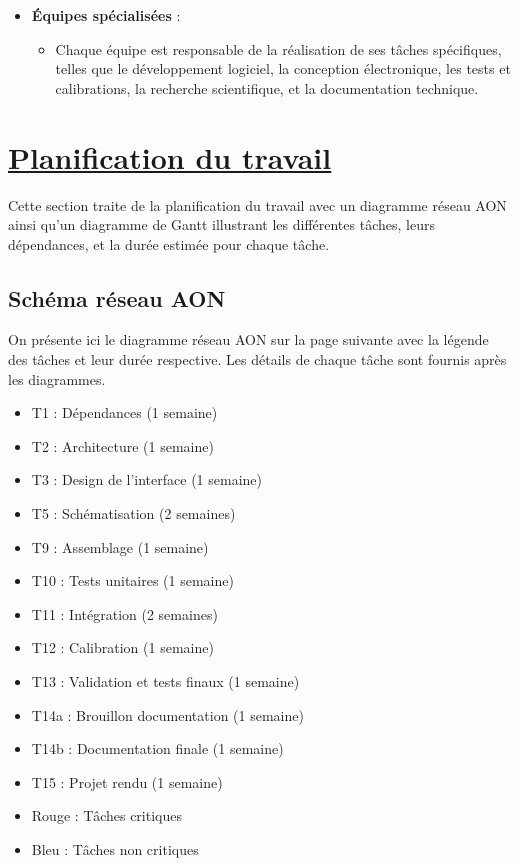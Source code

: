 \documentclass[11pt]{article}
\begin{document}
\begin{itemize}
    \begin{itemize}
      \item Gérer l'approvisionnement en matériel et équipements.
      \item Coordonner la distribution des ressources aux équipes.
      \item Assurer la maintenance des équipements utilisés dans le projet.
    \end{itemize}
  \item \textbf{Équipes spécialisées} :
    \begin{itemize}
      \item Chaque équipe est responsable de la réalisation de ses tâches spécifiques, telles que le développement logiciel, la conception électronique, les tests et calibrations, la recherche scientifique, et la documentation technique.
    \end{itemize}
\end{itemize}

\newpage

\section{\underline{Planification du travail}}
Cette section traite de la planification du travail avec un diagramme réseau AON ainsi qu'un diagramme de Gantt illustrant les différentes tâches, leurs dépendances, et la durée estimée pour chaque tâche.

\subsection{Schéma réseau AON}
On présente ici le diagramme réseau AON sur la page suivante avec la légende des tâches et leur durée respective. Les détails de chaque tâche sont fournis après les diagrammes.

\begin{itemize}
  \item T1 : Dépendances (1 semaine)
  \item T2 : Architecture (1 semaine)
  \item T3 : Design de l'interface (1 semaine)
  \item T5 : Schématisation (2 semaines)
  \item T9 : Assemblage (1 semaine)
  \item T10 : Tests unitaires (1 semaine)
  \item T11 : Intégration (2 semaines)
  \item T12 : Calibration (1 semaine)
  \item T13 : Validation et tests finaux (1 semaine)
  \item T14a : Brouillon documentation (1 semaine)
  \item T14b : Documentation finale (1 semaine)
  \item T15 : Projet rendu (1 semaine)
  \item Rouge : Tâches critiques
  \item Bleu : Tâches non critiques
\end{itemize}
\end{document}
